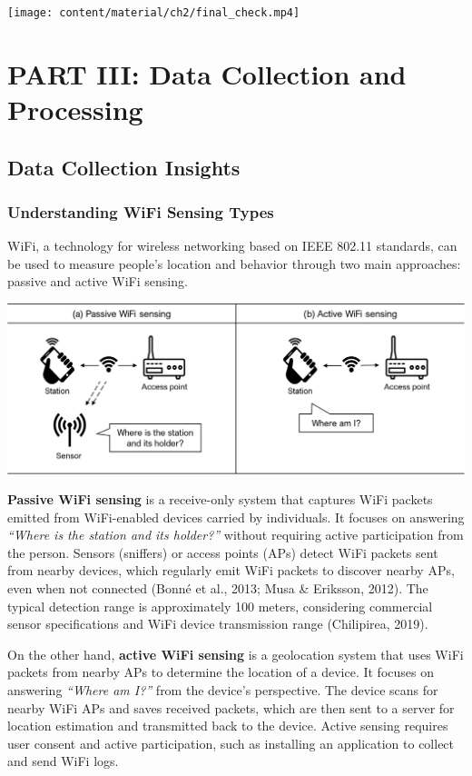 \documentclass[
  letterpaper,
]{scrbook}
\begin{document}
\texttt{[image: content/material/ch2/final\_check.mp4]}

\part{PART III: Data Collection and Processing}

\chapter{Data Collection Insights}\label{data-collection-insights}

\section{Understanding WiFi Sensing
Types}\label{understanding-wifi-sensing-types}

WiFi, a technology for wireless networking based on IEEE 802.11
standards, can be used to measure people's location and behavior through
two main approaches: passive and active WiFi sensing.

\includegraphics{content/material/ch3/wifi-sensing-types.png}

\textbf{Passive WiFi sensing} is a receive-only system that captures
WiFi packets emitted from WiFi-enabled devices carried by individuals.
It focuses on answering \emph{``Where is the station and its holder?''}
without requiring active participation from the person. Sensors
(sniffers) or access points (APs) detect WiFi packets sent from nearby
devices, which regularly emit WiFi packets to discover nearby APs, even
when not connected (Bonné et al., 2013; Musa \& Eriksson, 2012). The
typical detection range is approximately 100 meters, considering
commercial sensor specifications and WiFi device transmission range
(Chilipirea, 2019).

On the other hand, \textbf{active WiFi sensing} is a geolocation system
that uses WiFi packets from nearby APs to determine the location of a
device. It focuses on answering \emph{``Where am I?''} from the device's
perspective. The device scans for nearby WiFi APs and saves received
packets, which are then sent to a server for location estimation and
transmitted back to the device. Active sensing requires user consent and
active participation, such as installing an application to collect and
send WiFi logs.
\end{document}
